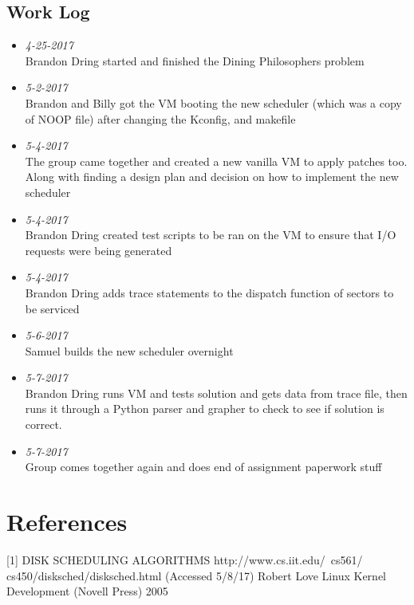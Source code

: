 \documentclass{article}
\begin{document}
    \subsection*{Work Log }
\begin{itemize}
  \item \textit{4-25-2017}\\ Brandon Dring started and finished the Dining Philosophers problem \\
  \item \textit{5-2-2017}\\ Brandon and Billy got the VM booting the new scheduler (which was a copy of NOOP file) after changing the Kconfig, and makefile \\
  \item \textit{5-4-2017}\\ The group came together and created a new vanilla VM to apply patches too. Along with finding a design plan and decision on how to implement the new scheduler \\
  \item \textit{5-4-2017}\\ Brandon Dring created test scripts to be ran on the VM to ensure that I/O requests were being generated \\
  \item \textit{5-4-2017}\\ Brandon Dring adds trace statements to the dispatch function of sectors to be serviced \\
  \item \textit{5-6-2017}\\ Samuel builds the new scheduler overnight  \\
  \item \textit{5-7-2017}\\ Brandon Dring runs VM and tests solution and gets data from trace file, then runs it through a Python parser and grapher to check to see if solution is correct. \\
  \item \textit{5-7-2017}\\ Group comes together again and does end of assignment paperwork stuff \\
\end{itemize}

    \section{References}
        [1] \hspace{10mm} DISK SCHEDULING ALGORITHMS http://www.cs.iit.edu/~cs561/ \newline \hspace{10mm} cs450/disksched/disksched.html (Accessed 5/8/17) \newline
        [2] \hspace{10mm} Robert Love Linux Kernel Development (Novell Press) 2005
\end{document}
